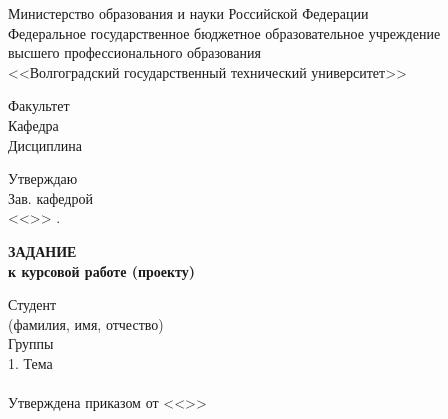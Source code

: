 \begin{titlepage}
    \begin{center}
        Министерство образования и науки Российской Федерации \\
        Федеральное государственное бюджетное образовательное учреждение\\
        высшего профессионального образования\\
        <<Волгоградский государственный технический университет>>\\
    \end{center}
    Факультет \underline{\hspace{14.7cm}}\\
    Кафедра \underline{\hspace{15.1cm}}\\
    Дисциплина \underline{\hspace{14.3cm}}
    \begin{flushright}
        Утверждаю\\
        Зав. кафедрой \underline{\hspace{6em}} \hspace{0.5em} \underline{\hspace{6em}} \\
        <<\underline{\hspace{2cm}}>>\underline{\hspace{5cm}} \the{}.
    \end{flushright}
    \begin{center}
        \large \MakeUppercase{\textbf{задание}} \\
        \normalsize\vspace{-0.2cm}\textbf{к курсовой работе (проекту)}
    \end{center}
    \begin{flushleft}
        Студент \underline{\hspace{20em}}\\
            \vspace{-0.2cm}\hspace{5cm}\footnotesize(фамилия, имя, отчество)\normalsize\\
        Группы \underline{\hspace{10em}}\\
        1. Тема \underline{\hspace{15.2cm}}\\
        \underline{\hspace{\textwidth}}\\
        Утверждена приказом от <<\underline{\hspace{1cm}}>> \underline{\hspace{4cm}} 

\end{flushleft}
\end{titlepage}
